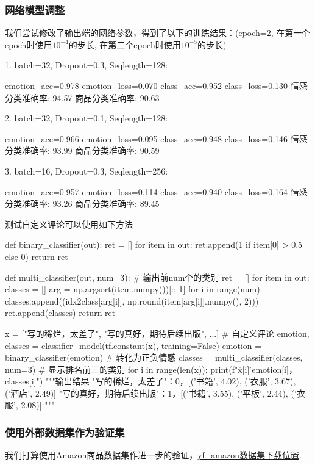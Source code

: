 \documentclass[12pt, a4paper, oneside]{ctexart}
\numberwithin{equation}{section}  %
\begin{document}
\subsubsection{网络模型调整}
我们尝试修改了输出端的网络参数，得到了以下的训练结果：(epoch=2, 在第一个epoch时使用$10^{-4}$的步长, 在第二个epoch时使用$10^{-5}$的步长)

1. batch=32, Dropout=0.3, Seqlength=128:
\begin{pythoncode}
emotion_acc=0.978 emotion_loss=0.070 class_acc=0.952 class_loss=0.130
情感分类准确率: 94.57%
商品分类准确率: 90.63%
\end{pythoncode}

2. batch=32, Dropout=0.1, Seqlength=128:
\begin{pythoncode}
emotion_acc=0.966 emotion_loss=0.095 class_acc=0.948 class_loss=0.146
情感分类准确率: 93.99%
商品分类准确率: 90.59%
\end{pythoncode}

3. batch=16, Dropout=0.3, Seqlength=256:
\begin{pythoncode}
emotion_acc=0.957 emotion_loss=0.114 class_acc=0.940 class_loss=0.164
情感分类准确率: 93.26%
商品分类准确率: 89.45%
\end{pythoncode}

测试自定义评论可以使用如下方法
\begin{pythoncode}
def binary_classifier(out):
    ret = []
    for item in out:
        ret.append(1 if item[0] > 0.5 else 0)
    return ret

def multi_classifier(out, num=3):  # 输出前num个的类别
    ret = []
    for item in out:
        classes = []
        arg = np.argsort(item.numpy())[::-1]
        for i in range(num):
            classes.append((idx2class[arg[i]], np.round(item[arg[i]].numpy(), 2)))
        ret.append(classes)
    return ret

x = ["写的稀烂，太差了", "写的真好，期待后续出版", ...]  # 自定义评论
emotion, classes = classifier_model(tf.constant(x), training=False)
emotion = binary_classifier(emotion)  # 转化为正负情感
classes = multi_classifier(classes, num=3)  # 显示排名前三的类别
for i in range(len(x)):
    print(f"\"{x[i]}\"：{emotion[i]}，{classes[i]}")
"""输出结果
"写的稀烂，太差了"：0，[('书籍', 4.02), ('衣服', 3.67), ('酒店', 2.49)]
"写的真好，期待后续出版"：1，[('书籍', 3.55), ('平板', 2.44), ('衣服', 2.08)]
"""
\end{pythoncode}
\subsubsection{使用外部数据集作为验证集}
我们打算使用Amazon商品数据集作进一步的验证，\href{https://github.com/SophonPlus/ChineseNlpCorpus/blob/master/datasets/yf_amazon/intro.ipynb}{yf\_amazon数据集下载位置}.
\end{document}
